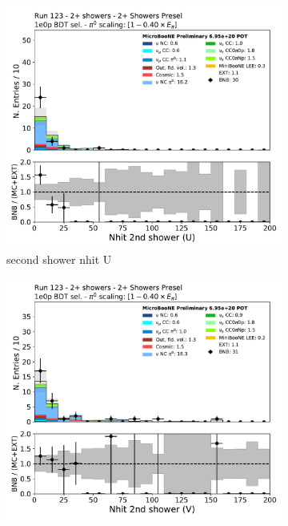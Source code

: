 \begin{figure}[H]
    \centering
    \begin{subfigure}{0.3\textwidth}
    \includegraphics[width=1.0\textwidth]{Sidebands/Figures/TwoShr_1e0pSel/BDT/secondshower_U_nhit.pdf}
    \caption{second shower nhit U}
    \end{subfigure}
    \begin{subfigure}{0.3\textwidth}
    \includegraphics[width=1.0\textwidth]{Sidebands/Figures/TwoShr_1e0pSel/BDT/secondshower_V_nhit.pdf}

\end{subfigure}
\end{figure}
